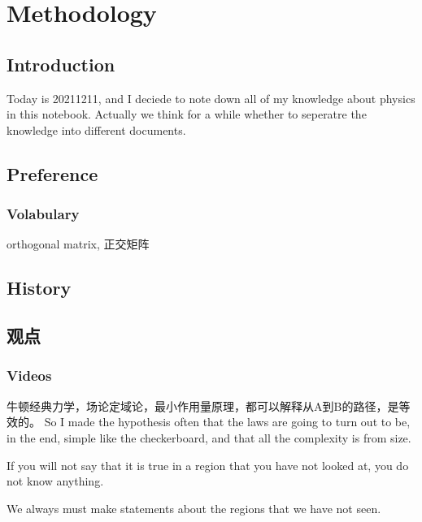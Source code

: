 


\chapter{Methodology}

\section{Introduction}
Today is 20211211, and I deciede to note down all of my knowledge about physics in this notebook. Actually we think for a while whether to seperatre the knowledge into different documents.

\section{Preference}
\subsection{Volabulary}
orthogonal matrix, 正交矩阵


\section{History}



\section{观点}

\subsection{Videos}

牛顿经典力学，场论定域论，最小作用量原理，都可以解释从A到B的路径，是等效的。
So I made the hypothesis often that the laws are going to turn out to be, in the end, simple like the checkerboard, and that all the complexity is from size.

If you will not say that it is true in a region that you have not looked at, you do not know anything.

We always must make statements about the regions that we have not seen.

